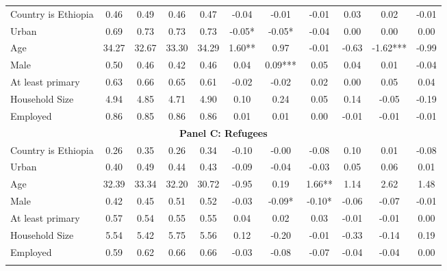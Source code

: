 \begin{tabular}{@{\extracolsep{5pt}}lcccccccccc}
Country is Ethiopia    & 0.46   & 0.49      & 0.46    & 0.47      & -0.04    & -0.01  & -0.01    & 0.03    & 0.02    & -0.01   \\
Urban    & 0.69      & 0.73   & 0.73   & 0.73  & -0.05*    & -0.05*   & -0.04   & 0.00     & 0.00    & 0.00   \\
Age     & 34.27 & 32.67   & 33.30   & 34.29     & 1.60**    & 0.97     & -0.01      & -0.63   & -1.62***     & -0.99   \\
Male    & 0.50    & 0.46     & 0.42       & 0.46    & 0.04      & 0.09***   & 0.05  & 0.04     & 0.01  & -0.04   \\
At least primary   & 0.63   & 0.66    & 0.65   & 0.61     & -0.02  & -0.02    & 0.02     & 0.00     & 0.05      & 0.04   \\
Household Size   & 4.94  & 4.85     & 4.71    & 4.90   & 0.10      & 0.24  & 0.05    & 0.14     & -0.05     & -0.19   \\
Employed   & 0.86    & 0.85     & 0.86 & 0.86     & 0.01    & 0.01     & 0.00    & -0.01     & -0.01      & -0.01   \\	\midrule \midrule  \multicolumn{11}{c}{\textbf{Panel C: Refugees}} \\  \midrule 
Country is Ethiopia  & 0.26       & 0.35    & 0.26    & 0.34    & -0.10     & -0.00   & -0.08    & 0.10   & 0.01     & -0.08   \\
Urban     & 0.40  & 0.49      & 0.44   & 0.43     & -0.09     & -0.04 & -0.03     & 0.05  & 0.06    & 0.01   \\
Age   & 32.39     & 33.34   & 32.20    & 30.72   & -0.95   & 0.19    & 1.66**     & 1.14    & 2.62  & 1.48   \\
Male    & 0.42     & 0.45    & 0.51    & 0.52    & -0.03    & -0.09*    & -0.10*     & -0.06 & -0.07      & -0.01   \\
At least primary     & 0.57 & 0.54        & 0.55    & 0.55    & 0.04    & 0.02    & 0.03     & -0.01     & -0.01      & 0.00   \\
Household Size    & 5.54     & 5.42    & 5.75   & 5.56     & 0.12    & -0.20    & -0.01   & -0.33      & -0.14      & 0.19   \\
Employed    & 0.59      & 0.62    & 0.66    & 0.66      & -0.03     & -0.08    & -0.07     & -0.04      & -0.04   & 0.00   \\
	\hline \hline \\[-1.8ex]
\end{tabular}


